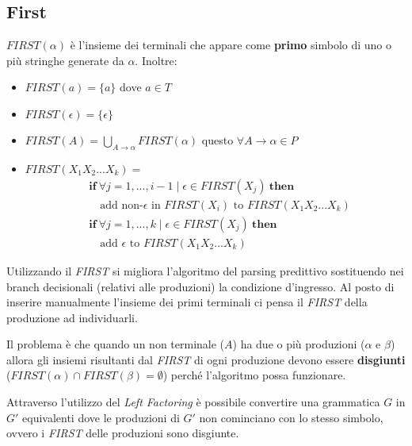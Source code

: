 \subsection{First}
\begin{definition}[First]
$FIRST(\alpha)$ è l'insieme dei terminali che appare come \textbf{primo}
simbolo di uno o più stringhe generate da $\alpha$. Inoltre:
\begin{itemize}
\item $FIRST(a) = \{a\}$ dove $a \in T$
\item $FIRST(\epsilon) = \{\epsilon\}$
\item $FIRST(A) = \bigcup_{A \to \alpha}FIRST(\alpha)$ questo $\forall A \to
\alpha \in P$
\item $FIRST(X_1X_2...X_k) =$
\begin{align*}
& \mathbf{if} \ \forall j = 1,...,i-1 \mid \epsilon \in FIRST(X_j) \
  \mathbf{then} \\
& \quad \text{add non-}\epsilon \text{ in } FIRST(X_i) \text{ to }
        FIRST(X_1X_2...X_k) \\
& \mathbf{if} \ \forall j = 1,...,k \mid \epsilon \in FIRST(X_j) \
  \mathbf{then} \\
& \quad \text{add }\epsilon \text{ to } FIRST(X_1X_2...X_k)
\end{align*}
\end{itemize}
\end{definition}



Utilizzando il \textit{FIRST} si migliora l'algoritmo del parsing predittivo
sostituendo nei branch decisionali (relativi alle produzioni) la condizione
d'ingresso. Al posto di inserire manualmente l'insieme dei primi terminali ci
pensa il \textit{FIRST} della produzione ad individuarli.

Il problema è che quando un non terminale ($A$) ha due o più produzioni
($\alpha$ e $\beta$) allora gli insiemi risultanti dal \textit{FIRST} di ogni
produzione devono essere \textbf{disgiunti}
($FIRST(\alpha) \cap FIRST(\beta) = \emptyset$) perché l'algoritmo possa
funzionare.

Attraverso l'utilizzo del \textit{Left Factoring} è possibile convertire una
grammatica $G$ in $G'$ equivalenti dove le produzioni di $G'$ non cominciano con
lo stesso simbolo, ovvero i \textit{FIRST} delle produzioni sono disgiunte.

